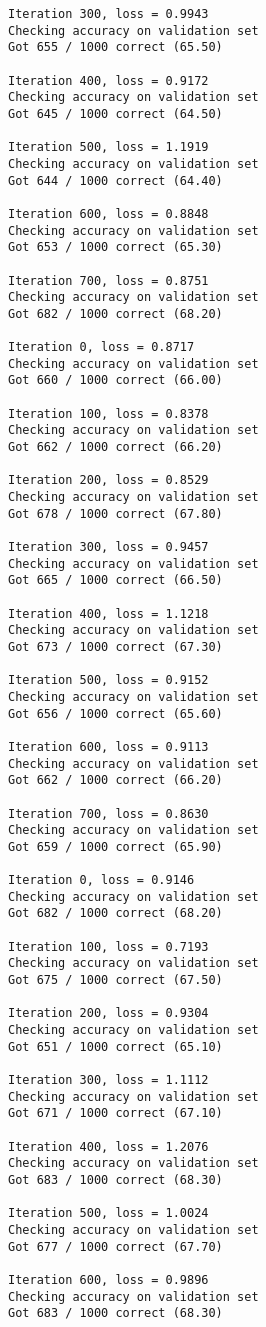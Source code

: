 \documentclass[11pt]{article}
\begin{document}
\begin{Verbatim}[commandchars=\\\{\}]
Iteration 300, loss = 0.9943
Checking accuracy on validation set
Got 655 / 1000 correct (65.50)

Iteration 400, loss = 0.9172
Checking accuracy on validation set
Got 645 / 1000 correct (64.50)

Iteration 500, loss = 1.1919
Checking accuracy on validation set
Got 644 / 1000 correct (64.40)

Iteration 600, loss = 0.8848
Checking accuracy on validation set
Got 653 / 1000 correct (65.30)

Iteration 700, loss = 0.8751
Checking accuracy on validation set
Got 682 / 1000 correct (68.20)

Iteration 0, loss = 0.8717
Checking accuracy on validation set
Got 660 / 1000 correct (66.00)

Iteration 100, loss = 0.8378
Checking accuracy on validation set
Got 662 / 1000 correct (66.20)

Iteration 200, loss = 0.8529
Checking accuracy on validation set
Got 678 / 1000 correct (67.80)

Iteration 300, loss = 0.9457
Checking accuracy on validation set
Got 665 / 1000 correct (66.50)

Iteration 400, loss = 1.1218
Checking accuracy on validation set
Got 673 / 1000 correct (67.30)

Iteration 500, loss = 0.9152
Checking accuracy on validation set
Got 656 / 1000 correct (65.60)

Iteration 600, loss = 0.9113
Checking accuracy on validation set
Got 662 / 1000 correct (66.20)

Iteration 700, loss = 0.8630
Checking accuracy on validation set
Got 659 / 1000 correct (65.90)

Iteration 0, loss = 0.9146
Checking accuracy on validation set
Got 682 / 1000 correct (68.20)

Iteration 100, loss = 0.7193
Checking accuracy on validation set
Got 675 / 1000 correct (67.50)

Iteration 200, loss = 0.9304
Checking accuracy on validation set
Got 651 / 1000 correct (65.10)

Iteration 300, loss = 1.1112
Checking accuracy on validation set
Got 671 / 1000 correct (67.10)

Iteration 400, loss = 1.2076
Checking accuracy on validation set
Got 683 / 1000 correct (68.30)

Iteration 500, loss = 1.0024
Checking accuracy on validation set
Got 677 / 1000 correct (67.70)

Iteration 600, loss = 0.9896
Checking accuracy on validation set
Got 683 / 1000 correct (68.30)


\end{Verbatim}
\end{document}
